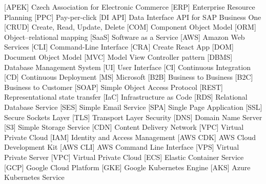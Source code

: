 \documentclass[12pt,a4paper]{report}
\begin{document}
\begin{acronym}[ICANN]
     [APEK] {Czech Association for Electronic Commerce}
     [ERP] {Enterprise Resource Planning}
     [PPC] {Pay-per-click}
     [DI API] {Data Interface API for SAP Business One}
     [CRUD] {Create, Read, Update, Delete}
     [COM] {Component Object Model}
     [ORM] {Object–relational mapping}
     [SaaS] {Software as a Service}
     [AWS] {Amazon Web Services}
     [CLI] {Command-Line Interface}
     [CRA] {Create React App}
     [DOM] {Document Object Model}
     [MVC] {Model View Controller pattern}
     [DBMS] {Database Management System}
     [UI] {User Interface}
     [CI] {Continuous Integration}
     [CD] {Continuous Deployment}
     [MS] {Microsoft}
     [B2B] {Business to Business}
     [B2C] {Business to Customer}
     [SOAP] {Simple Object Access Protocol}
     [REST] {Representational state transfer}
     [IaC] {Infrastructure as Code}
     [RDS] {Relational Database Service}
     [SES] {Simple Email Service}
     [SPA] {Single Page Application}
     [SSL] {Secure Sockets Layer}
     [TLS] {Transport Layer Security}
     [DNS] {Domain Name Server}
     [S3] {Simple Storage Service}
     [CDN] {Content Delivery Network}
     [VPC] {Virtual Private Cloud}
     [IAM] {Identity and Access Management}
     [AWS CDK] {AWS Cloud Development Kit}
     [AWS CLI] {AWS Command Line Interface}
     [VPS] {Virtual Private Server}
     [VPC] {Virtual Private Cloud}
     [ECS] {Elastic Container Service}
     [GCP] {Google Cloud Platform}
     [GKE] {Google Kubernetes Engine}
     [AKS] {Azure Kubernetes Service}
\end{acronym}
\end{document}

